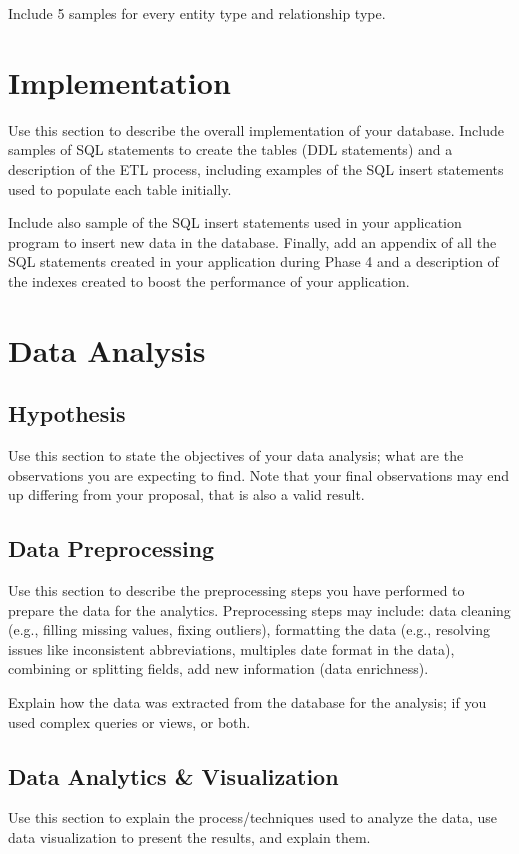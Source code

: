 \documentclass[12pt]{article}
\begin{document}
    Include 5 samples for every entity type and relationship type.

    \section{Implementation}
    Use this section to describe the overall implementation of your database. Include samples of SQL statements to create the tables (DDL statements) and a description of the ETL process, including examples of the SQL insert statements used to populate each table initially.

    Include also sample of the SQL insert statements used in your application program to insert new data in the database. Finally, add an appendix of all the SQL statements created in your application during Phase 4 and a description of the indexes created to boost the performance of your application.
    \section{Data Analysis}
    \subsection{Hypothesis}
    Use this section to state the objectives of your data analysis; what are the observations you are expecting to find. Note that your final
    observations may end up differing from your proposal, that is also a valid result.
    \subsection{Data Preprocessing}
    Use this section to describe the preprocessing steps you have performed to prepare the data for the analytics. Preprocessing steps may include: data cleaning (e.g., filling missing values, fixing outliers), formatting the data (e.g., resolving issues like inconsistent abbreviations, multiples date format in the data), combining or splitting fields, add new information (data enrichness).

    Explain how the data was extracted from the database for the analysis; if you used complex queries or views, or both.
    \subsection{Data Analytics \& Visualization}
    Use this section to explain the process/techniques used to analyze the data, use data visualization to present the results, and explain them.
\end{document}
